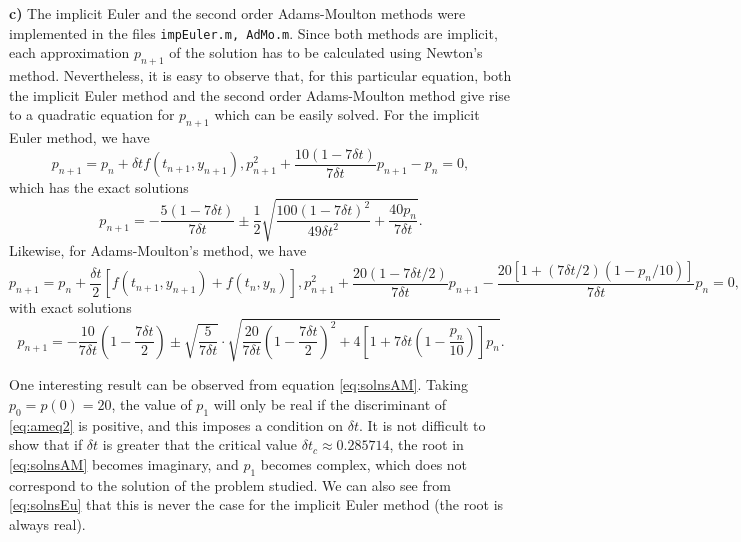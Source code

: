 \documentclass[a4paper,10pt]{article}
\begin{document}
\textbf{c) } The implicit Euler and the second order Adams-Moulton methods were implemented in the files \texttt{impEuler.m, AdMo.m}. Since both methods are implicit, each approximation $p_{n+1}$ of the solution has to be calculated using Newton's method. Nevertheless, it is easy to observe that, for this particular equation, both the implicit Euler method and the second order Adams-Moulton method give rise to a quadratic equation for $p_{n+1}$ which can be easily solved. For the implicit Euler method, we have
\begin{subequations}
\begin{equation} p_{n+1} = p_n + \delta t f(t_{n+1},y_{n+1}),\end{equation}
\begin{equation}p_{n+1}^2+\frac{10(1-7\delta t)}{7\delta t}p_{n+1}-p_n=0,\end{equation}
\label{eq:EuQuad}
\end{subequations}
which has the exact solutions
\begin{equation}
p_{n+1} = -\frac{5(1-7\delta t)}{7\delta t}\pm\frac{1}{2}\sqrt{\frac{100(1-7\delta t)^2}{49\delta t^2}+\frac{40p_n}{7\delta t}}.
\label{eq:solnsEu}
\end{equation}
Likewise, for Adams-Moulton's method, we have
\begin{subequations}
\begin{equation} p_{n+1} = p_n + \frac{\delta t}{2}[f(t_{n+1},y_{n+1})+f(t_n,y_n)],\label{eq:ameq1}\end{equation}
\begin{equation}p_{n+1}^2+\frac{20(1-7\delta t/2)}{7\delta t}p_{n+1}-\frac{20[1+(7\delta t/2)(1-p_n/10)]}{7\delta t}p_n=0,\label{eq:ameq2}\end{equation}
\label{eq:AMQuad}
\end{subequations}
with exact solutions
\begin{equation}
p_{n+1} = -\frac{10}{7\delta t}\left(1-\frac{7\delta t}{2}\right)\pm\sqrt{\frac{5}{7\delta t}}\cdot\sqrt{\frac{20}{7\delta t}\left(1-\frac{7\delta t}{2}\right)^2+4\left[1+7\delta t\left(1-\frac{p_n}{10}\right)\right]p_n}.
\label{eq:solnsAM}
\end{equation}

One interesting result can be observed from equation \eqref{eq:solnsAM}. Taking $p_0 = p(0) = 20$, the value of $p_1$ will only be real if the discriminant of \eqref{eq:ameq2} is positive, and this imposes a condition on $\delta t$. It is not difficult to show that if $\delta t$ is greater that the critical value $\delta t_c \approx 0.285714 $, the root in \eqref{eq:solnsAM} becomes imaginary, and $p_1$ becomes complex, which does not correspond to the solution of the  problem studied. We can also see from \eqref{eq:solnsEu} that this is never the case for the implicit Euler method (the root is always real).
\end{document}
